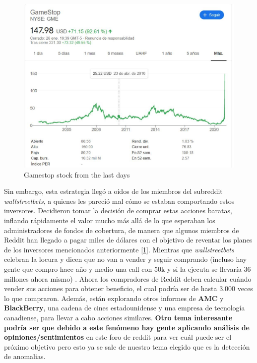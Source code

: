 \documentclass[12pt,twoside]{report}
\begin{document}
\begin{figure}[H]
\includegraphics[width=\textwidth]{../code/figures/gamestop-stocks}
\centering
\caption{Gamestop stock from the last days}
\label{fig:gamestop-stock}
\end{figure}

Sin embargo, esta estrategia llegó a oídos de los miembros del subreddit \textit{wallstreetbets}, a quienes les pareció mal cómo se estaban comportando estos inversores. Decidieron tomar la decisión de comprar estas acciones baratas, inflando rápidamente el valor mucho más allá de lo que esperaban los administradores de fondos de cobertura, de manera que algunos miembros de Reddit han llegado a pagar miles de dólares con el objetivo de reventar los planes de los inversores mencionados anteriormente [\ref{fig:gamestop-stock}]. Mientras que \textit{wallstreetbets} celebran la locura y dicen que no van a vender y seguir comprando (incluso hay gente que compro hace año y medio una call con 50k y si la ejecuta se llevaría 36 millones ahora mismo) \cite{call}. Ahora los compradores de Reddit deben calcular cuándo vender sus acciones para obtener beneficio, el cual podría ser de hasta 3.000 veces lo que compraron. Además, están explorando otros informes de \textbf{AMC} y \textbf{BlackBerry}, una cadena de cines estadounidense y una empresa de tecnología canadiense, para llevar a cabo acciones similares. \textbf{Otro tema interesante podría ser que debido a este fenómeno hay gente aplicando análisis de opiniones/sentimientos} en este foro de reddit para ver cuál puede ser el próximo objetivo pero esto ya se sale de nuestro tema elegido que es la detección de anomalias.
\end{document}
